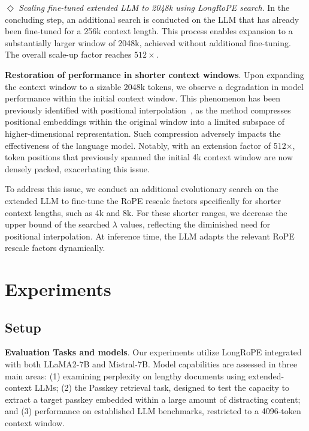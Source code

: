 $\Diamond$ \textit{Scaling fine-tuned extended LLM to 2048k using LongRoPE search}. In the concluding step, an additional search is conducted on the LLM that has already been fine-tuned for a 256k context length. This process enables expansion to a substantially larger window of 2048k, achieved without additional fine-tuning. The overall scale-up factor reaches $512\times$.

\textbf{Restoration of performance in shorter context windows}. Upon expanding the context window to a sizable 2048k tokens, we observe a degradation in model performance within the initial context window. This phenomenon has been previously identified with positional interpolation~\cite{pi}, as the method compresses positional embeddings within the original window into a limited subspace of higher-dimensional representation. Such compression adversely impacts the effectiveness of the language model. Notably, with an extension factor of 512$\times$, token positions that previously spanned the initial 4k context window are now densely packed, exacerbating this issue.

To address this issue, we conduct an additional evolutionary search on the extended LLM to fine-tune the RoPE rescale factors specifically for shorter context lengths, such as 4k and 8k. For these shorter ranges, we decrease the upper bound of the searched $\lambda$ values, reflecting the diminished need for positional interpolation. At inference time, the LLM adapts the relevant RoPE rescale factors dynamically.

 \section{Experiments}

\label{sec:exp}
\subsection{Setup}
\textbf{Evaluation Tasks and models}. Our experiments utilize LongRoPE integrated with both LLaMA2-7B and Mistral-7B. Model capabilities are assessed in three main areas: (1) examining perplexity on lengthy documents using extended-context LLMs; (2) the Passkey retrieval task, designed to test the capacity to extract a target passkey embedded within a large amount of distracting content; and (3) performance on established LLM benchmarks, restricted to a 4096-token context window.

